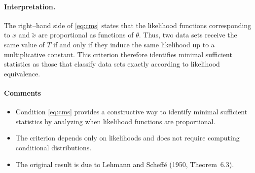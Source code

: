 \paragraph{Interpretation.}
The right--hand side of \eqref{eq:cms} states that the likelihood functions corresponding to
$x$ and $\tilde{x}$ are proportional as functions of $\theta$.
Thus, two data sets receive the same value of $T$ if and only if they induce the same likelihood
up to a multiplicative constant.
This criterion therefore identifies minimal sufficient statistics as those that classify
data sets exactly according to likelihood equivalence.

\paragraph{Comments}
\begin{itemize}
    \item Condition \eqref{eq:cms} provides a constructive way to identify minimal sufficient
    statistics by analyzing when likelihood functions are proportional.
    \item The criterion depends only on likelihoods and does not require computing conditional
    distributions.
    \item The original result is due to Lehmann and Scheff\'e (1950, Theorem~6.3).
\end{itemize}
\medskip
